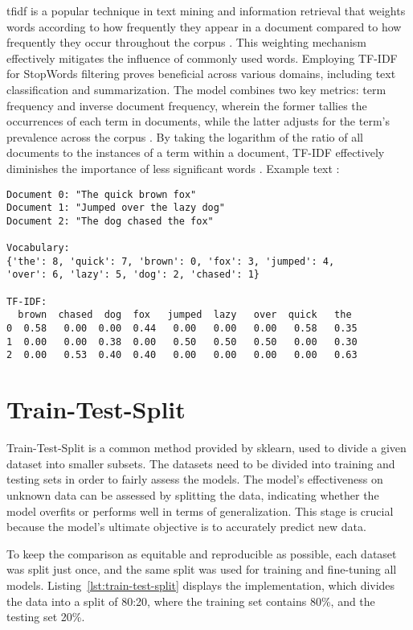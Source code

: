 \ac{tfidf} is a popular technique in text mining and information retrieval that weights words according to how frequently they appear in a document compared to how frequently they occur throughout the corpus \citep{vijayarani_preprocessing_2015}. This weighting mechanism effectively mitigates the influence of commonly used words. Employing TF-IDF for StopWords filtering proves beneficial across various domains, including text classification and summarization. The model combines two key metrics: term frequency and inverse document frequency, wherein the former tallies the occurrences of each term in documents, while the latter adjusts for the term's prevalence across the corpus \citep{vijayarani_preprocessing_2015}. By taking the logarithm of the ratio of all documents to the instances of a term within a document, TF-IDF effectively diminishes the importance of less significant words \citep{tabassum_survey_2020}. Example text \citep{openai_gpt3}: 

\begin{verbatim}
Document 0: "The quick brown fox"
Document 1: "Jumped over the lazy dog"
Document 2: "The dog chased the fox"

Vocabulary: 
{'the': 8, 'quick': 7, 'brown': 0, 'fox': 3, 'jumped': 4,
'over': 6, 'lazy': 5, 'dog': 2, 'chased': 1}

TF-IDF:
  brown  chased  dog  fox   jumped  lazy   over  quick   the 
0  0.58   0.00  0.00  0.44   0.00   0.00   0.00   0.58   0.35  
1  0.00   0.00  0.38  0.00   0.50   0.50   0.50   0.00   0.30  
2  0.00   0.53  0.40  0.40   0.00   0.00   0.00   0.00   0.63   
\end{verbatim}

\section{Train-Test-Split}

Train-Test-Split is a common method provided by sklearn, used to divide a given dataset into smaller subsets. The datasets need to be divided into training and testing sets in order to fairly assess the models. The model's effectiveness on unknown data can be assessed by splitting the data, indicating whether the model overfits or performs well in terms of generalization. This stage is crucial because the model's ultimate objective is to accurately predict new data.

To keep the comparison as equitable and reproducible as possible, each dataset was split just once, and the same split was used for training and fine-tuning all models. Listing~\ref{lst:train-test-split} displays the implementation, which divides the data into a split of 80:20, where the training set contains 80\%, and the testing set 20\%. 

